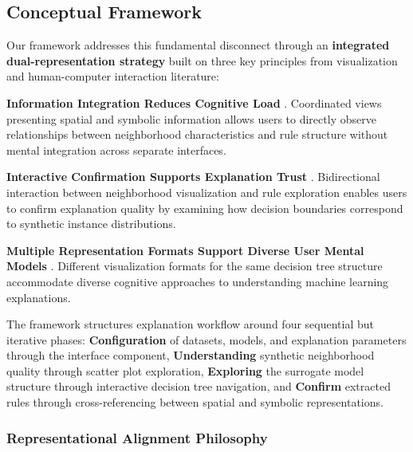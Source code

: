 

\subsection{Conceptual Framework}

Our framework addresses this fundamental disconnect through an \textbf{integrated dual-representation strategy} built on three key principles from visualization and human-computer interaction literature:

\textbf{Information Integration Reduces Cognitive Load} \cite{readingsInformationVi}. Coordinated views presenting spatial and symbolic information allows users to directly observe relationships between neighborhood characteristics and rule structure without mental integration across separate interfaces.

\textbf{Interactive Confirmation Supports Explanation Trust} \cite{8807299}. Bidirectional interaction between neighborhood visualization and rule exploration enables users to confirm explanation quality by examining how decision boundaries correspond to synthetic instance distributions.

\textbf{Multiple Representation Formats Support Diverse User Mental Models} \cite{Z_ller_2023}. Different visualization formats for the same decision tree structure accommodate diverse cognitive approaches to understanding machine learning explanations.

The framework structures explanation workflow around four sequential but iterative phases: \textbf{Configuration} of datasets, models, and explanation parameters through the interface component, \textbf{Understanding} synthetic neighborhood quality through scatter plot exploration, \textbf{Exploring} the surrogate model structure through interactive decision tree navigation, and \textbf{Confirm} extracted rules through cross-referencing between spatial and symbolic representations.

\subsubsection{Representational Alignment Philosophy}

